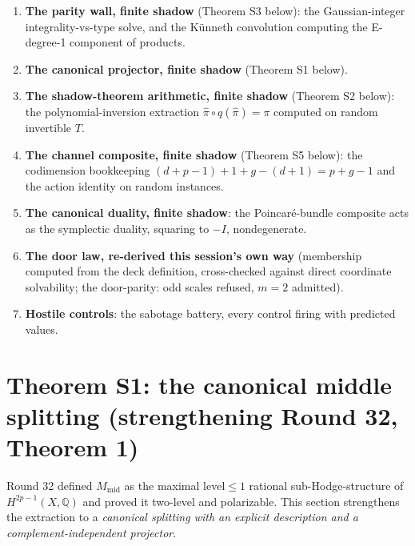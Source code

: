 \documentclass[11pt]{article}
\newcommand{\Q}{\mathbb{Q}}
\begin{document}
\begin{enumerate}[label=(V\arabic*)]
\item \textbf{The parity wall, finite shadow} (Theorem S3 below): the
Gaussian-integer integrality-vs-type solve, and the Künneth convolution
computing the E-degree-1 component of products.
\item \textbf{The canonical projector, finite shadow} (Theorem S1 below).
\item \textbf{The shadow-theorem arithmetic, finite shadow} (Theorem S2
below): the polynomial-inversion extraction
$\hat\pi\circ q(\hat\pi)=\pi$ computed on random invertible $T$.
\item \textbf{The channel composite, finite shadow} (Theorem S5 below): the
codimension bookkeeping $(d+p-1)+1+g-(d+1)=p+g-1$ and the action identity on
random instances.
\item \textbf{The canonical duality, finite shadow}: the Poincaré-bundle
composite acts as the symplectic duality, squaring to $-I$, nondegenerate.
\item \textbf{The door law, re-derived this session's own way} (membership
computed from the deck definition, cross-checked against direct coordinate
solvability; the door-parity: odd scales refused, $m=2$ admitted).
\item \textbf{Hostile controls}: the sabotage battery, every control firing
with predicted values.
\end{enumerate}

\section{Theorem S1: the canonical middle splitting (strengthening Round 32, Theorem 1)}

Round 32 defined $M_{\mathrm{mid}}$ as the maximal level${}\le{}1$ rational
sub-Hodge-structure of $H^{2p-1}(X,\Q)$ and proved it two-level and
polarizable. This section strengthens the extraction to a \emph{canonical
splitting with an explicit description and a complement-independent
projector}.
\end{document}
